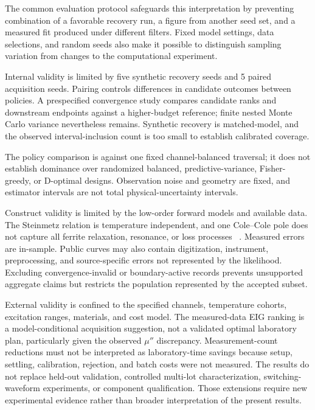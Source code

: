 \documentclass[10pt,a4paper,twocolumn]{article}
\makeatletter
\renewcommand\subsection{\@startsection{subsection}{2}{0pt}{1ex plus .2ex}{.35ex}{\normalsize\bfseries}}
\providecommand{\EIGSeedCount}{5}
\makeatother
\begin{document}
The common evaluation protocol safeguards this interpretation by preventing
combination of a favorable recovery run, a figure from another seed set, and
a measured fit produced under different filters. Fixed model settings, data
selections, and random seeds also make it possible to distinguish sampling
variation from changes to the computational experiment.

\subsection{Threats to validity}
Internal validity is limited by five synthetic recovery seeds and
\EIGSeedCount{} paired acquisition seeds. Pairing controls differences in
candidate outcomes between policies. A prespecified convergence study compares
candidate ranks and downstream endpoints against a higher-budget reference;
finite nested Monte Carlo variance nevertheless remains. Synthetic recovery is
matched-model, and the observed interval-inclusion count is too small to
establish calibrated coverage.

The policy comparison is against one fixed channel-balanced traversal; it
does not establish dominance over randomized balanced, predictive-variance,
Fisher-greedy, or D-optimal designs. Observation noise and geometry are fixed,
and estimator intervals are not total physical-uncertainty intervals.

Construct validity is limited by the low-order forward models and available
data. The Steinmetz relation is temperature independent, and one Cole--Cole
pole does not capture all ferrite relaxation, resonance, or loss processes
~\cite{tsutaoka2003}. Measured errors are in-sample. Public curves may also
contain digitization, instrument, preprocessing, and source-specific errors
not represented by the likelihood. Excluding convergence-invalid or
boundary-active records prevents unsupported aggregate claims but restricts
the population represented by the accepted subset.

External validity is confined to the specified channels, temperature cohorts,
excitation ranges, materials, and cost model. The measured-data EIG ranking is
a model-conditional acquisition suggestion, not a validated optimal laboratory
plan, particularly given the observed $\mu''$ discrepancy. Measurement-count reductions
must not be interpreted as laboratory-time savings because setup, settling,
calibration, rejection, and batch costs were not measured. The results do not
replace held-out validation, controlled multi-lot characterization,
switching-waveform experiments, or component qualification. Those extensions
require new experimental evidence rather than broader interpretation of the
present results.
\end{document}
